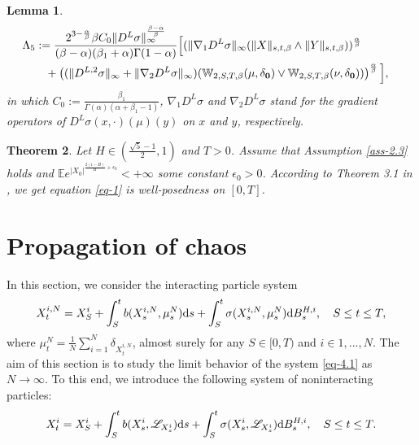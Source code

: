 \documentclass[12pt]{article}
\newtheorem{theorem}{Theorem}[section]
\newtheorem{lemma}[theorem]{Lemma}
\def\L{\mathscr{L}}
\def\d{\text{\rm{d}}}
\def\E{\mathbb E}
\def\de{\delta}
\def\W{\mathbb{W}}
\numberwithin{equation}{section}
\begin{document}
\begin{lemma}
\begin{equation}
\begin{split}
			&\Lambda_5 :=\frac {2^{3-\frac {\alpha} {\beta}} \beta C_0 \|D^L\sigma\|_\infty^{\frac {\beta-\alpha} {\beta}}} {(\beta-\alpha)(\beta_1+\alpha)\Gamma(1-\alpha)} \Big[ (\|\nabla_1 D^L\sigma\|_\infty (\|X\|_{s,t,\beta}\wedge\|Y\|_{s,t,\beta}))^{\frac {\alpha} {\beta}}\cr
			&\qquad + \left((\|D^{L,2}\sigma\|_\infty+\|\nabla_2 D^L\sigma\|_\infty)( \W_{2,S,T,\beta}(\mu,\de_{\bf 0})\vee\W_{2,S,T,\beta}(\nu,\de_{\bf 0})) \right)^{\frac {\alpha}{\beta}}  \Big],
		\end{split}
	\end{equation}
	in which $C_0:=\frac{\beta_1}{\Gamma(\alpha)(\alpha+\beta_1 -1)}$, $\nabla_1 D^L\sigma$ and $\nabla_2 D^L\sigma$ stand for the gradient operators of $D^L\sigma(x,\cdot)(\mu)(y)$ on $x$ and $y$, respectively.
	\end{lemma}
	
	\begin{theorem}
		Let $H\in (\frac{\sqrt{5}-1}{2},1)$ and $T > 0$. Assume that Assumption \ref{ass-2.3} holds and $\E e^{{|X_0|}^{\frac{2(1-H)}{H}+\epsilon_0}}< +\infty$
		some constant $\epsilon_0 > 0$. According to Theorem 3.1 in \cite{fan}, we get equation \eqref{eq-1} is well-posedness on $[0, T]$.
	\end{theorem}
	
	\section{Propagation of chaos}
	In this section, we consider the  interacting particle system
	\begin{equation}\label{eq-4.1}
		X^{i,N}_t=X_S^i+\int_{S}^{t}b(X^{i,N}_s,\mu_s^N)\d s+\int_{S}^{t}\sigma(X^{i,N}_s,\mu_s^N)\d B^{H,i}_s, \quad S\leq t\leq T,
	\end{equation}
	where
	$\mu_t^N=\frac 1N\sum_{i=1}^N\delta_{X_t^{i,N}}$, almost surely for any $S \in [0,T )$ and $i \in {1,...,N}$. The aim of this section is to study the  limit behavior of the system \eqref{eq-4.1} as $N\rightarrow\infty.$  To this end, we introduce the following system of noninteracting particles:
	\begin{equation}\label{eq-4.2}
		X^i_t=X_S^i+\int_{S}^{t}b(X^i_s,\L_{X^i_s})\d s+\int_{S}^{t}\sigma(X^i_s,\L_{X^i_s})\d B^{H,i}_s,\quad S\leq t\leq T.
	\end{equation}
	
\end{document}
